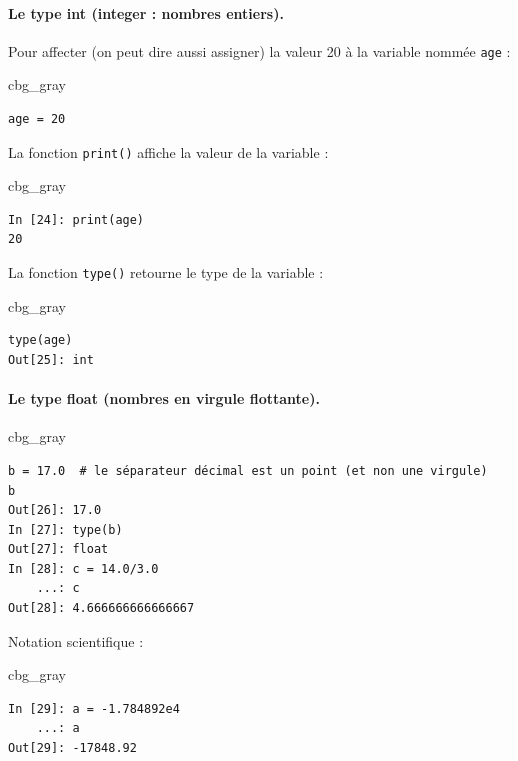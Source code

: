 \documentclass[%
oneside,                 %
final,                   %
10pt]{article}
\newenvironment{_cod_tight}[1]{
   \def\FrameCommand{\colorbox{#1}}
   \FrameRule0.6pt\MakeFramed {\FrameRestore}\vskip3mm}
   {\vskip0mm\endMakeFramed}
\newenvironment{cod}[1]{
\bgroup\rmfamily
\fboxsep=0mm\relax
\begin{_cod_tight}{#1}
\list{}{\parsep=-2mm\parskip=0mm\topsep=0pt\leftmargin=2mm
\rightmargin=2\leftmargin\leftmargin=4pt\relax}
\item\relax}
{\endlist\end{_cod_tight}\egroup}
\begin{document}
\paragraph{Le type int (integer : nombres entiers).}
Pour affecter (on peut dire aussi assigner) la valeur 20 à la variable nommée \texttt{age} :

\begin{cod}{cbg_gray}\begin{verbatim}
age = 20
\end{verbatim}
\end{cod}
\noindent
La fonction \texttt{print()} affiche la valeur de la variable :

\begin{cod}{cbg_gray}\begin{verbatim}
In [24]: print(age)
20
\end{verbatim}
\end{cod}
\noindent
La fonction \texttt{type()} retourne le type de la variable :
\begin{cod}{cbg_gray}\begin{verbatim}
type(age)
Out[25]: int
\end{verbatim}
\end{cod}
\noindent
\paragraph{Le type float (nombres en virgule flottante).}
\begin{cod}{cbg_gray}\begin{verbatim}
b = 17.0  # le séparateur décimal est un point (et non une virgule)
b
Out[26]: 17.0
In [27]: type(b)
Out[27]: float
In [28]: c = 14.0/3.0
    ...: c
Out[28]: 4.666666666666667
\end{verbatim}
\end{cod}
\noindent
Notation scientifique :
\begin{cod}{cbg_gray}\begin{verbatim}
In [29]: a = -1.784892e4
    ...: a
Out[29]: -17848.92
\end{verbatim}
\end{cod}
\noindent
\end{document}
